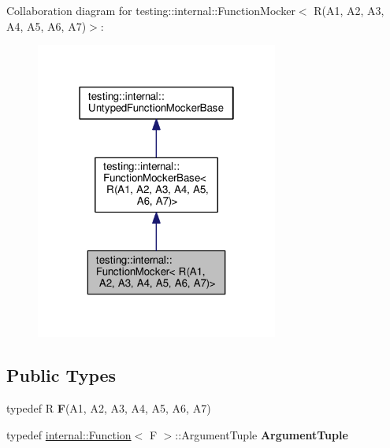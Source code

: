 Collaboration diagram for testing\+:\+:internal\+:\+:Function\+Mocker$<$ R(A1, A2, A3, A4, A5, A6, A7)$>$\+:\nopagebreak
\begin{figure}[H]
\begin{center}
\leavevmode
\includegraphics[width=226pt]{classtesting_1_1internal_1_1FunctionMocker_3_01R_07A1_00_01A2_00_01A3_00_01A4_00_01A5_00_01A6_00_01A7_08_4__coll__graph}
\end{center}
\end{figure}
\subsection*{Public Types}
\begin{DoxyCompactItemize}
\item 
typedef R {\bfseries F}(A1, A2, A3, A4, A5, A6, A7)\hypertarget{classtesting_1_1internal_1_1FunctionMocker_3_01R_07A1_00_01A2_00_01A3_00_01A4_00_01A5_00_01A6_00_01A7_08_4_a2ea0e33d9cc0d1f57d58b4aee98c117c}{}\label{classtesting_1_1internal_1_1FunctionMocker_3_01R_07A1_00_01A2_00_01A3_00_01A4_00_01A5_00_01A6_00_01A7_08_4_a2ea0e33d9cc0d1f57d58b4aee98c117c}

\item 
typedef \hyperlink{structtesting_1_1internal_1_1Function}{internal\+::\+Function}$<$ F $>$\+::Argument\+Tuple {\bfseries Argument\+Tuple}\hypertarget{classtesting_1_1internal_1_1FunctionMocker_3_01R_07A1_00_01A2_00_01A3_00_01A4_00_01A5_00_01A6_00_01A7_08_4_a313911b9c80b57c8c25f0ad5ef2d0bdc}{}\label{classtesting_1_1internal_1_1FunctionMocker_3_01R_07A1_00_01A2_00_01A3_00_01A4_00_01A5_00_01A6_00_01A7_08_4_a313911b9c80b57c8c25f0ad5ef2d0bdc}

\end{DoxyCompactItemize}

